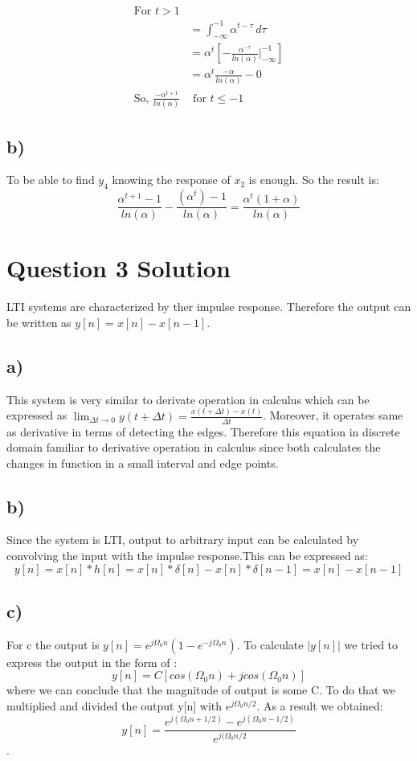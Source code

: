 \documentclass[letterpaper,12pt]{article}
\begin{document}
\begin{equation}
    \begin{split}
        \text{For }t > 1&  \\
        &=   \int_{-\infty}^{-1} \alpha^{t-\tau}  \,d\tau \\
        &= \alpha^t [- \frac{\alpha^{-\tau}}{ln(\alpha)} |_{-\infty}^{-1}]\\
        &= \alpha^t \frac{-\alpha}{ln(\alpha) } - 0\\
        \text{So, } \frac{-\alpha^{t+1}}{ln(\alpha)} &\text{ for } t \leq -1 
    \end{split}
\end{equation}

\subsection{b)}
To be able to find \(y_4\) knowing the response of \(x_2\) is enough. So the result is:
\[
\frac{\alpha^{t+1}-1}{ln(\alpha)} - \frac{(\alpha^t)-1}{ln(\alpha)} = \frac{\alpha^t(1+\alpha)}{ln(\alpha)}    
\]
\section{Question 3 Solution}
LTI systems are characterized by ther impulse response. Therefore the output can be written as \(y[n] = x[n] - x[n-1]\).


\subsection{a)}
This system is very similar to derivate operation in calculus which can be expressed as    \(\lim_{\Delta t \to 0} y(t+ \Delta t) = \frac{x(t+ \Delta t) - x(t)}{\Delta t}\).
  Moreover, it operates same as derivative in terms of detecting the edges. Therefore this equation in discrete domain familiar to derivative operation in calculus since both calculates the changes in function in a small interval and edge points.
\subsection{b)}
Since the system is LTI, output to arbitrary input can be calculated by convolving the input with the impulse response.This can be expressed as: \newline
 \[y[n]= x[n] * h[n] = x[n]* \delta [n] - x[n] * \delta [n-1]= x[n]- x[n-1]\]
\subsection{c)}
For c the output is \( y[n]= e^{j \Omega_0 n} (1-e^{-j \Omega_0 n})\).\newline
To calculate $|y[n]|$ we tried to express the output in the form of :
\[y[n]=C[cos(\Omega_0 n) + jcos(\Omega_0 n)]\] where we can conclude that the magnitude of output is some C. To do that we multiplied and divided the output y[n] with \(e^{j \Omega_0 n/2}\).
As a result we obtained:
 \[y[n]=\frac{e^{j (\Omega_0 n+1/2)}-e^{j (\Omega_0 n-1/2)}}{e^{j (\Omega_0 n/2}}\].
\end{document}
